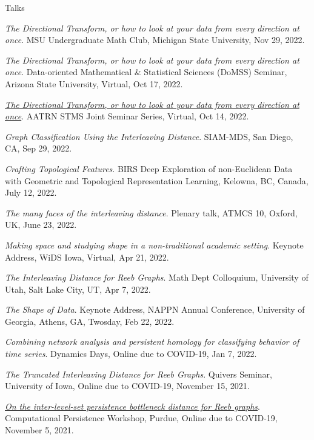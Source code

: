 \documentclass{resume} %
\begin{document}
\begin{rSection}{Talks}
\begin{etaremune}
\item\emph{The Directional Transform, or how to look at your data from every direction at once}. MSU Undergraduate Math Club, Michigan State University, Nov 29, 2022. 

\item\emph{The Directional Transform, or how to look at your data from every direction at once}. Data-oriented Mathematical \& Statistical Sciences (DoMSS) Seminar, Arizona State University, Virtual, Oct 17, 2022. 

\item\emph{\href{https://www.youtube.com/watch?v=_-gDBosxp2M}{The Directional Transform, or how to look at your data from every direction at once}}. AATRN STMS Joint Seminar Series, Virtual, Oct 14, 2022. 

\item\emph{Graph Classification Using the Interleaving Distance}. SIAM-MDS, San Diego, CA, Sep 29, 2022. 

\item\emph{Crafting Topological Features}. BIRS Deep Exploration of non-Euclidean Data with Geometric and Topological Representation Learning, Kelowna, BC, Canada, July 12, 2022. 

\item\emph{The many faces of the interleaving distance}. Plenary talk, ATMCS 10, Oxford, UK, June 23, 2022. 

\item\emph{Making space and studying shape in a non-traditional academic setting}. Keynote Address, WiDS Iowa, Virtual, Apr 21, 2022. 

\item\emph{The Interleaving Distance for Reeb Graphs}. Math Dept Colloquium, University of Utah, Salt Lake City, UT, Apr 7, 2022. 

\item\emph{The Shape of Data}. Keynote Address, NAPPN Annual Conference, University of Georgia, Athens, GA, Twosday, Feb 22, 2022. 

\item\emph{Combining network analysis and persistent homology for classifying behavior of time series}. Dynamics Days, Online due to COVID-19, Jan 7, 2022. 

\item\emph{The Truncated Interleaving Distance for Reeb Graphs}. Quivers Seminar, University of Iowa, Online due to COVID-19, November 15, 2021. 

\item\emph{\href{https://drive.google.com/file/d/1lnZ_g1aQBkX4W6F9SRovgQ8Bzih1Is97/view?usp=sharing}{On the inter-level-set persistence bottleneck distance for Reeb graphs}}. Computational Persistence Workshop, Purdue, Online due to COVID-19, November 5, 2021. 


\end{etaremune}
\end{rSection}
\end{document}
